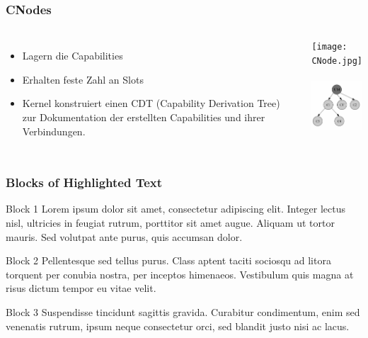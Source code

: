 \documentclass{beamer}
\begin{document}
\begin{frame}
\frametitle{CNodes}
\begin{columns}[c]
\begin{itemize}
\item Lagern die Capabilities
\item Erhalten feste Zahl an Slots
\item Kernel konstruiert einen CDT (Capability Derivation Tree) zur Dokumentation der erstellten Capabilities und ihrer Verbindungen.
\end{itemize}
{\texttt{[image: CNode.jpg]}} \\~~
{\includegraphics[width=2cm]{CDT.jpg}}
\end{columns} 
\end{frame}
\begin{frame}
\frametitle{Blocks of Highlighted Text}
\begin{block}{Block 1}
Lorem ipsum dolor sit amet, consectetur adipiscing elit. Integer lectus nisl, ultricies in feugiat rutrum, porttitor sit amet augue. Aliquam ut tortor mauris. Sed volutpat ante purus, quis accumsan dolor.
\end{block}

\begin{block}{Block 2}
Pellentesque sed tellus purus. Class aptent taciti sociosqu ad litora torquent per conubia nostra, per inceptos himenaeos. Vestibulum quis magna at risus dictum tempor eu vitae velit.
\end{block}

\begin{block}{Block 3}
Suspendisse tincidunt sagittis gravida. Curabitur condimentum, enim sed venenatis rutrum, ipsum neque consectetur orci, sed blandit justo nisi ac lacus.
\end{block}
\end{frame}

\end{document}
